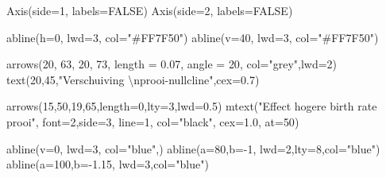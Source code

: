 \documentclass[
  a4paper,
]{scrbook}
\newenvironment{Shaded}{\begin{snugshade}}{\end{snugshade}}
\newcommand{\AttributeTok}[1]{\textcolor[rgb]{0.40,0.45,0.13}{#1}}
\newcommand{\ConstantTok}[1]{\textcolor[rgb]{0.56,0.35,0.01}{#1}}
\newcommand{\DecValTok}[1]{\textcolor[rgb]{0.68,0.00,0.00}{#1}}
\newcommand{\FloatTok}[1]{\textcolor[rgb]{0.68,0.00,0.00}{#1}}
\newcommand{\FunctionTok}[1]{\textcolor[rgb]{0.28,0.35,0.67}{#1}}
\newcommand{\NormalTok}[1]{\textcolor[rgb]{0.00,0.23,0.31}{#1}}
\newcommand{\SpecialCharTok}[1]{\textcolor[rgb]{0.37,0.37,0.37}{#1}}
\newcommand{\StringTok}[1]{\textcolor[rgb]{0.13,0.47,0.30}{#1}}
\theoremstyle{definition}
\theoremstyle{remark}
\begin{document}
\begin{Shaded}
\begin{Highlighting}[]
\FunctionTok{Axis}\NormalTok{(}\AttributeTok{side=}\DecValTok{1}\NormalTok{, }\AttributeTok{labels=}\ConstantTok{FALSE}\NormalTok{)}
\FunctionTok{Axis}\NormalTok{(}\AttributeTok{side=}\DecValTok{2}\NormalTok{, }\AttributeTok{labels=}\ConstantTok{FALSE}\NormalTok{)}

\FunctionTok{abline}\NormalTok{(}\AttributeTok{h=}\DecValTok{0}\NormalTok{, }\AttributeTok{lwd=}\DecValTok{3}\NormalTok{, }\AttributeTok{col=}\StringTok{"\#FF7F50"}\NormalTok{)}
\FunctionTok{abline}\NormalTok{(}\AttributeTok{v=}\DecValTok{40}\NormalTok{, }\AttributeTok{lwd=}\DecValTok{3}\NormalTok{, }\AttributeTok{col=}\StringTok{"\#FF7F50"}\NormalTok{)}

\FunctionTok{arrows}\NormalTok{(}\DecValTok{20}\NormalTok{, }\DecValTok{63}\NormalTok{, }\DecValTok{20}\NormalTok{, }\DecValTok{73}\NormalTok{, }\AttributeTok{length =} \FloatTok{0.07}\NormalTok{, }\AttributeTok{angle =} \DecValTok{20}\NormalTok{, }\AttributeTok{col=}\StringTok{"grey"}\NormalTok{,}\AttributeTok{lwd=}\DecValTok{2}\NormalTok{)}
\FunctionTok{text}\NormalTok{(}\DecValTok{20}\NormalTok{,}\DecValTok{45}\NormalTok{,}\StringTok{"Verschuiving }\SpecialCharTok{\textbackslash{}n}\StringTok{prooi{-}nullcline"}\NormalTok{,}\AttributeTok{cex=}\FloatTok{0.7}\NormalTok{)}

\FunctionTok{arrows}\NormalTok{(}\DecValTok{15}\NormalTok{,}\DecValTok{50}\NormalTok{,}\DecValTok{19}\NormalTok{,}\DecValTok{65}\NormalTok{,}\AttributeTok{length=}\DecValTok{0}\NormalTok{,}\AttributeTok{lty=}\DecValTok{3}\NormalTok{,}\AttributeTok{lwd=}\FloatTok{0.5}\NormalTok{)}
\FunctionTok{mtext}\NormalTok{(}\StringTok{"Effect hogere birth rate prooi"}\NormalTok{, }\AttributeTok{font=}\DecValTok{2}\NormalTok{,}\AttributeTok{side=}\DecValTok{3}\NormalTok{, }\AttributeTok{line=}\DecValTok{1}\NormalTok{, }\AttributeTok{col=}\StringTok{"black"}\NormalTok{, }\AttributeTok{cex=}\FloatTok{1.0}\NormalTok{, }\AttributeTok{at=}\DecValTok{50}\NormalTok{)}

\FunctionTok{abline}\NormalTok{(}\AttributeTok{v=}\DecValTok{0}\NormalTok{, }\AttributeTok{lwd=}\DecValTok{3}\NormalTok{, }\AttributeTok{col=}\StringTok{"blue"}\NormalTok{,)}
\FunctionTok{abline}\NormalTok{(}\AttributeTok{a=}\DecValTok{80}\NormalTok{,}\AttributeTok{b=}\SpecialCharTok{{-}}\DecValTok{1}\NormalTok{, }\AttributeTok{lwd=}\DecValTok{2}\NormalTok{,}\AttributeTok{lty=}\DecValTok{8}\NormalTok{,}\AttributeTok{col=}\StringTok{"blue"}\NormalTok{)}
\FunctionTok{abline}\NormalTok{(}\AttributeTok{a=}\DecValTok{100}\NormalTok{,}\AttributeTok{b=}\SpecialCharTok{{-}}\FloatTok{1.15}\NormalTok{, }\AttributeTok{lwd=}\DecValTok{3}\NormalTok{,}\AttributeTok{col=}\StringTok{"blue"}\NormalTok{)}


\end{Highlighting}
\end{Shaded}
\end{document}

